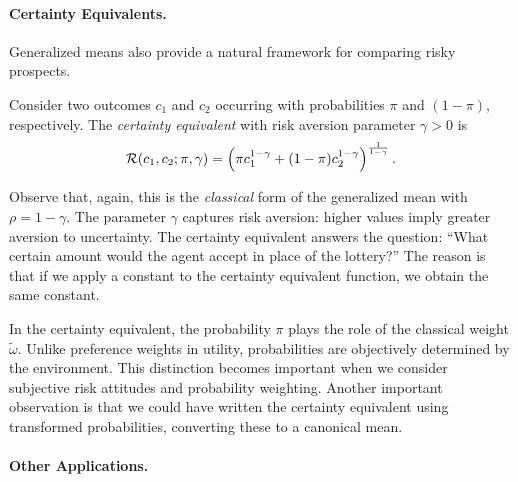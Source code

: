 \paragraph{Certainty Equivalents.}

Generalized means also provide a natural framework for comparing risky prospects.

\begin{definition}
\label{def:certainty-equivalent}
Consider two outcomes $c_1$ and $c_2$ occurring with probabilities $\pi$ and $(1-\pi)$, respectively. The \emph{certainty equivalent} with risk aversion parameter $\gamma > 0$ is
\begin{equation}
\label{eq:certainty-equivalent}
\mathcal{R}(c_1, c_2; \pi, \gamma) = \left( \pi c_1^{1-\gamma} + (1-\pi) c_2^{1-\gamma} \right)^{\frac{1}{1-\gamma}}.
\end{equation}
\end{definition}
Observe that, again, this is the \emph{classical} form of the generalized mean with $\rho = 1 - \gamma$. The parameter $\gamma$ captures risk aversion: higher values imply greater aversion to uncertainty. The certainty equivalent answers the question: ``What certain amount would the agent accept in place of the lottery?'' The reason is that if we apply a constant to the certainty equivalent function, we obtain the same constant. 

\begin{calloutimportant}
In the certainty equivalent, the probability $\pi$ plays the role of the classical weight $\tilde{\omega}$. Unlike preference weights in utility, probabilities are objectively determined by the environment. This distinction becomes important when we consider subjective risk attitudes and probability weighting.
Another important observation is that we could have written the certainty equivalent using transformed probabilities, converting these to a canonical mean. 
\end{calloutimportant}

\paragraph{Other Applications.}

